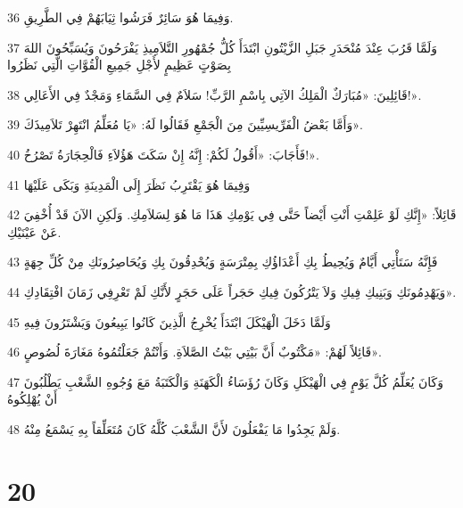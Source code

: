 \par 36 وَفِيمَا هُوَ سَائِرٌ فَرَشُوا ثِيَابَهُمْ فِي الطَّرِيقِ.
\par 37 وَلَمَّا قَرُبَ عِنْدَ مُنْحَدَرِ جَبَلِ الزَّيْتُونِ ابْتَدَأَ كُلُّ جُمْهُورِ التَّلاَمِيذِ يَفْرَحُونَ وَيُسَبِّحُونَ اللهَ بِصَوْتٍ عَظِيمٍ لأَجْلِ جَمِيعِ الْقُوَّاتِ الَّتِي نَظَرُوا
\par 38 قَائِلِينَ: «مُبَارَكٌ الْمَلِكُ الآتِي بِاسْمِ الرَّبِّ! سَلاَمٌ فِي السَّمَاءِ وَمَجْدٌ فِي الأَعَالِي!».
\par 39 وَأَمَّا بَعْضُ الْفَرِّيسِيِّينَ مِنَ الْجَمْعِ فَقَالُوا لَهُ: «يَا مُعَلِّمُ انْتَهِرْ تَلاَمِيذَكَ».
\par 40 فَأَجَابَ: «أَقُولُ لَكُمْ: إِنَّهُ إِنْ سَكَتَ هَؤُلاَءِ فَالْحِجَارَةُ تَصْرُخُ!».
\par 41 وَفِيمَا هُوَ يَقْتَرِبُ نَظَرَ إِلَى الْمَدِينَةِ وَبَكَى عَلَيْهَا
\par 42 قَائِلاً: «إِنَّكِ لَوْ عَلِمْتِ أَنْتِ أَيْضاً حَتَّى فِي يَوْمِكِ هَذَا مَا هُوَ لِسَلاَمِكِ. وَلَكِنِ الآنَ قَدْ أُخْفِيَ عَنْ عَيْنَيْكِ.
\par 43 فَإِنَّهُ سَتَأْتِي أَيَّامٌ وَيُحِيطُ بِكِ أَعْدَاؤُكِ بِمِتْرَسَةٍ وَيُحْدِقُونَ بِكِ وَيُحَاصِرُونَكِ مِنْ كُلِّ جِهَةٍ
\par 44 وَيَهْدِمُونَكِ وَبَنِيكِ فِيكِ وَلاَ يَتْرُكُونَ فِيكِ حَجَراً عَلَى حَجَرٍ لأَنَّكِ لَمْ تَعْرِفِي زَمَانَ افْتِقَادِكِ».
\par 45 وَلَمَّا دَخَلَ الْهَيْكَلَ ابْتَدَأَ يُخْرِجُ الَّذِينَ كَانُوا يَبِيعُونَ وَيَشْتَرُونَ فِيهِ
\par 46 قَائِلاً لَهُمْ: «مَكْتُوبٌ أَنَّ بَيْتِي بَيْتُ الصَّلاَةِ. وَأَنْتُمْ جَعَلْتُمُوهُ مَغَارَةَ لُصُوصٍ».
\par 47 وَكَانَ يُعَلِّمُ كُلَّ يَوْمٍ فِي الْهَيْكَلِ وَكَانَ رُؤَسَاءُ الْكَهَنَةِ وَالْكَتَبَةُ مَعَ وُجُوهِ الشَّعْبِ يَطْلُبُونَ أَنْ يُهْلِكُوهُ
\par 48 وَلَمْ يَجِدُوا مَا يَفْعَلُونَ لأَنَّ الشَّعْبَ كُلَّهُ كَانَ مُتَعَلِّقاً بِهِ يَسْمَعُ مِنْهُ.

\chapter{20}

